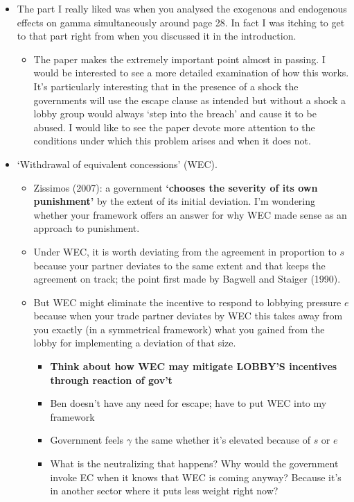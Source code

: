 \documentclass[12pt]{article}
\newcommand{\ga}{\gamma}
\begin{document}
		\begin{itemize}
			\item The part I really liked was when you analysed the exogenous and endogenous effects on gamma simultaneously around page 28.  In fact I was itching to get to that part right from when you discussed it in the introduction.  
				\begin{itemize}
					\item The paper makes the extremely important point almost in passing.  I would be interested to see a more detailed examination of how this works.  It's particularly interesting that in the presence of a shock the governments will use the escape clause as intended but without a shock a lobby group would always `step into the breach' and cause it to be abused.  I would like to see the paper devote more attention to the conditions under which this problem arises and when it does not.
				\end{itemize}
			\item `Withdrawal of equivalent concessions' (WEC).
				\begin{itemize}
					\item Zissimos (2007): a government \textbf{`chooses the severity of its own punishment'} by the extent of its initial deviation. I'm wondering whether your framework offers an answer for why WEC made sense as an approach to punishment.
					\item Under WEC, it is worth deviating from the agreement in proportion to $s$ because your partner deviates to the same extent and that keeps the agreement on track; the point first made by Bagwell and Staiger (1990).
					\item But WEC might eliminate the incentive to respond to lobbying pressure $e$ because when your trade partner deviates by WEC this takes away from you exactly (in a symmetrical framework) what you gained from the lobby for implementing a deviation of that size.
						\begin{itemize}
							\item \textbf{Think about how WEC may mitigate LOBBY'S incentives through reaction of gov't}
							\item Ben doesn't have any need for escape; have to put WEC into my framework
							\item Government feels $\ga$ the same whether it's elevated because of $s$ or $e$
							\item What is the neutralizing that happens? Why would the government invoke EC when it knows that WEC is coming anyway? Because it's in another sector where it puts less weight right now?

\end{itemize}
\end{itemize}
\end{itemize}
\end{document}
